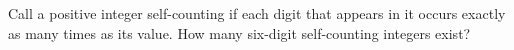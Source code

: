 Call a positive integer self-counting if each digit that appears in it occurs exactly as many times as its value. How many six-digit self-counting integers exist?

